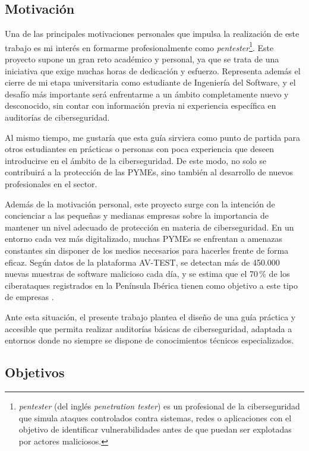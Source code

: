 \documentclass[a4paper, 11pt]{article}
\begin{document}
\subsection{Motivación}


Una de las principales motivaciones personales que impulsa la realización de este trabajo es mi interés en formarme profesionalmente como \textit{pentester}\footnote{\textit{pentester} (del inglés \textit{penetration tester}) es un profesional de la ciberseguridad que simula ataques controlados contra sistemas, redes o aplicaciones con el objetivo de identificar vulnerabilidades antes de que puedan ser explotadas por actores maliciosos.}. Este proyecto supone un gran reto académico y personal, ya que se trata de una iniciativa que exige muchas horas de dedicación y esfuerzo. Representa además el cierre de mi etapa universitaria como estudiante de Ingeniería del Software, y el desafío más importante será enfrentarme a un ámbito completamente nuevo y desconocido, sin contar con información previa ni experiencia específica en auditorías de ciberseguridad. 


Al mismo tiempo, me gustaría que esta guía sirviera como punto de partida para otros estudiantes en prácticas o personas con poca experiencia que deseen introducirse en el ámbito de la ciberseguridad. De este modo, no solo se contribuirá a la protección de las PYMEs, sino también al desarrollo de nuevos profesionales en el sector.


Además de la motivación personal, este proyecto surge con la intención de concienciar a las pequeñas y medianas empresas sobre la importancia de mantener un nivel adecuado de protección en materia de ciberseguridad. En un entorno cada vez más digitalizado, muchas PYMEs se enfrentan a amenazas constantes sin disponer de los medios necesarios para hacerles frente de forma eficaz. Según datos de la plataforma AV-TEST, se detectan más de 450.000 nuevas muestras de software malicioso cada día, y se estima que el 70\,\% de los ciberataques registrados en la Península Ibérica tienen como objetivo a este tipo de empresas \cite{avtest}. 


Ante esta situación, el presente trabajo plantea el diseño de una guía práctica y accesible que permita realizar auditorías básicas de ciberseguridad, adaptada a entornos donde no siempre se dispone de conocimientos técnicos especializados.

\subsection{Objetivos}
\end{document}
